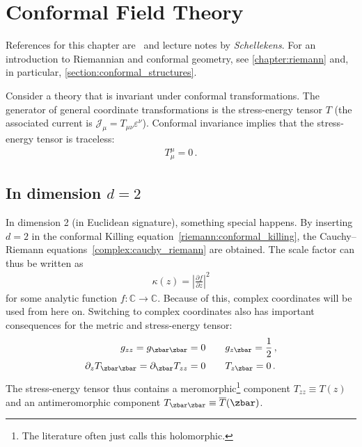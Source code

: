\chapter{Conformal Field Theory}\label{chapter:cft}

    References for this chapter are~\citet{schottenloher_mathematical_2008} and lecture notes by \textit{Schellekens}. For an introduction to Riemannian and conformal geometry, see \cref{chapter:riemann} and, in particular, \cref{section:conformal_structures}.

    \begin{property}
        Consider a theory that is invariant under conformal transformations. The generator of general coordinate transformations is the stress-energy tensor $T$ (the associated current is $\mathcal{J}_\mu = T_{\mu\nu}\varepsilon^\nu$). Conformal invariance implies that the stress-energy tensor is traceless:
        \begin{gather}
            T^\mu_\mu = 0\,.
        \end{gather}
    \end{property}

\section{\texorpdfstring{In dimension $d=2$}{In dimension d=2}}

    In dimension 2 (in Euclidean signature), something special happens. By inserting $d=2$ in the conformal Killing equation~\eqref{riemann:conformal_killing}, the Cauchy--Riemann equations~\ref{complex:cauchy_riemann} are obtained. The scale factor can thus be written as
    \begin{gather}
        \kappa(z) = \left|\frac{\partial f}{\partial z}\right|^2
    \end{gather}
    for some analytic function $f:\mathbb{C}\rightarrow\mathbb{C}$. Because of this, complex coordinates will be used from here on. Switching to complex coordinates also has important consequences for the metric and stress-energy tensor:
    \begin{gather}
        \begin{aligned}
            g_{zz} = g_{\zbar\zbar} = 0&\qquad g_{z\zbar} = \frac{1}{2}\,,\\
            \partial_zT_{\zbar\zbar} = \partial_{\zbar} T_{zz} = 0&\qquad T_{z\zbar} = 0\,.
        \end{aligned}
    \end{gather}
    The stress-energy tensor thus contains a meromorphic\footnote{The literature often just calls this holomorphic.} component $T_{zz}\equiv T(z)$ and an antimeromorphic component $T_{\zbar\zbar}\equiv\overline{T}(\zbar)$.

